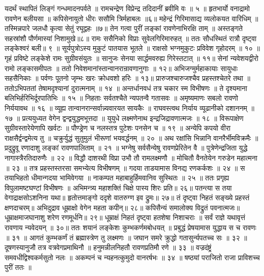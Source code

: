 यदर्थं स्थापितं लिङ्गं गन्धमादनपर्वते ॥
रामचन्द्रेण विप्रेन्द्र तदिदानीं ब्रवीमि वः ॥ ५ ॥
हृतभार्यो वनाद्रामो रावणेन बलीयसा ॥
कपिसेनायुतो धीरः ससौमि त्रिर्महाबलः ॥६॥
महेन्द्रं गिरिमासाद्य व्यलोकयत वारिधिम् ॥
तस्मिन्नपारे जलधौ कृत्वा सेतुं रघूद्वहः ॥७॥
तेन गत्वा पुरीं लङ्कां रावणेनाभिरक्षि ताम् ॥
अस्तङ्गते सहस्रांशौ पौर्णमास्यां निशामुखे॥८॥
रामः ससैनिको विप्राः सुवेलगिरिमारुहत् ॥
ततः सौधस्थितं रात्रौ दृष्ट्वा लङ्केश्वरं बली॥ ९ ॥
सूर्यपुत्रोऽस्य मुकुटं पातयास भूतले ॥
राक्षसो भग्नमुकुटः प्रविवेश गृहोदरम् ॥ १० ॥
गृहं प्रविष्टे लङ्केशे रामः सुग्रीवसंयुतः ॥
सानुजः सेनया सार्द्धमवरुह्य गिरेस्तटात् ॥ ११॥
सेनां न्यवेशयद्वीरो रामो लङ्कासमीपतः ॥
ततो निवेशमानांस्तान्वानरान्रावणानुगाः ॥ १२॥
अभिजग्मुर्महाकायाः सायुधाः सहसैनिकाः ॥
पर्वणः पूतनो जृम्भः खरः क्रोधवशो हरिः ॥ १३॥
प्रारुजश्चारुजश्चैव प्रहस्तश्चेतरे तथा ॥
ततोऽभिपततां तेषामदृश्यानां दुरात्मनाम् ॥ १४ ॥
अन्तर्धानवधं तत्र चकार स्म विभीषणः ॥
ते दृश्यमाना बलिभिर्हरिभिर्दूरपातिभिः ॥ १५ ॥
निहताः सर्वतश्चैते न्यपतन्वै गतासवः ॥
अमृष्यमाणः सबलो रावणो निर्ययावथ ॥ १६ ॥
व्यूह्य तान्वानरान्सर्वान्न्यवारयत सायकैः ॥
राघवस्त्वथ निर्याय व्यूढानीको दशाननम् ॥ १७ ॥
प्रत्ययुध्यत वेगेन द्वन्द्वयुद्धमभूत्तदा ॥
युयुधे लक्ष्मणेनाथ इन्द्रजिद्रावणात्मजः ॥ १८ ॥
विरूपाक्षेण सुग्रीवस्तारेयेणापि खर्वटः ॥
पौण्ड्रेण च नलस्तत्र पुटेशः पनसेन च ॥ १९ ॥
अन्येपि कपयो वीरा राक्षसैर्द्वन्द्वमेत्य तु ॥
चक्रुर्युद्धं सुतुमुलं भीरूणां भयवर्द्धनम् ॥ २० ॥
अथ रक्षांसि भिन्नानि वानरैर्भीमविक्रमैः ॥
प्रदुद्रुवू रणादाशु लङ्कां रावणपालिताम् ॥ २१ ॥
भग्नेषु सर्वसैन्येषु रावणप्रेरितेन वै ॥
पुत्रेणेन्द्रजिता युद्धे नागास्त्रैरतिदारुणैः ॥ २२ ॥
विद्धौ दाशरथी विप्रा उभौ तौ रामलक्ष्मणौ ॥
मोचितौ वैनतेयेन गरुडेन महात्मना ॥ २३ ॥
तत्र प्रहस्तस्तरसा समभ्येत्य विभीषणम् ॥
गदया ताडयामास विनद्य रणकर्कशः ॥ २४ ॥
स तयाभिहतो धीमान्गदया भामिवेगया ॥
नाकम्पत महाबाहुर्हिमवानिव सुस्थितः ॥ २५ ॥
ततः प्रगृह्य विपुलामष्टघण्टां विभीषणः ॥
अभिमन्त्र्य महाशक्तिं चिक्षे पास्य शिरः प्रति॥ २६॥
पतन्त्या स तया वेगाद्राक्षसोऽशनिना यथा॥
हृतोत्तमाङ्गो ददृशे वातरुग्ण इव द्रुमः॥ २७॥
तं दृष्ट्वा निहतं सङ्ख्ये प्रहस्तं क्षणदाचरम्॥
अभिदुद्राव धूम्राक्षो वेगेन महता कपीन्॥ २८॥
कपिसैन्यं समालोक्य विद्रुतं पवनात्मजः॥
धूम्राक्षमाजघानाशु शरेण रणमूर्धनि॥ २९॥
धूम्राक्षं निहतं दृष्ट्वा हतशेषा निशाचराः ॥
सर्वं राज्ञे यथावृत्तं रावणाय न्यवेदयन् ॥ ३०॥
ततः शयानं लङ्केशः कुम्भकर्णमबोधयत् ॥
प्रबुद्धं प्रेषयामास युद्धाय स च रावणः ॥ ३१ ॥
आगतं कुम्भकर्णं तं ब्रह्मास्त्रेण तु लक्ष्मणः ॥
जघान समरे क्रुद्धो गतासुर्न्यपतच्च सः ॥ ३२ ॥
दूषणस्यानुजौ तत्र वत्रवेगप्रमाथिनौ ॥
हनुमन्नीलनिहतौ रावणप्रतिमौ रणे ॥ ३३ ॥
वज्रदंष्ट्रं समवधीद्विश्वकर्मसुतो नलः ॥
अकम्पनं च न्यहनत्कुमुदो वानरर्षभः ॥ ३४ ॥
षष्ठ्यां पराजितो राजा प्राविशच्च पुरीं ततः ॥
